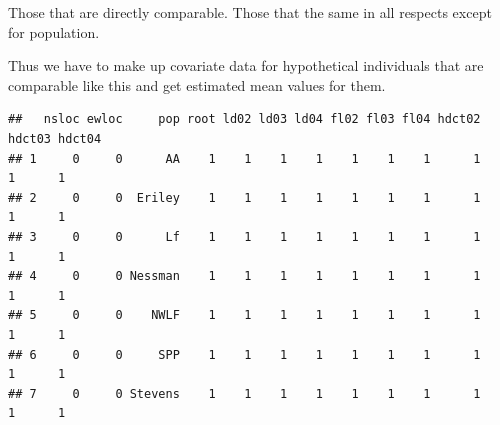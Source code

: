 \documentclass[
  ignorenonframetext,
]{beamer}
\newenvironment{Shaded}{\begin{snugshade}}{\end{snugshade}}
\newcommand{\AttributeTok}[1]{\textcolor[rgb]{0.13,0.29,0.53}{#1}}
\newcommand{\DecValTok}[1]{\textcolor[rgb]{0.00,0.00,0.81}{#1}}
\newcommand{\FunctionTok}[1]{\textcolor[rgb]{0.13,0.29,0.53}{\textbf{#1}}}
\newcommand{\NormalTok}[1]{#1}
\newcommand{\OtherTok}[1]{\textcolor[rgb]{0.56,0.35,0.01}{#1}}
\newcommand{\SpecialCharTok}[1]{\textcolor[rgb]{0.81,0.36,0.00}{\textbf{#1}}}
\begin{document}
\begin{frame}[fragile]{}
\protect\hypertarget{section-30}{}
Those that are directly comparable. Those that the same in all respects
except for population.

Thus we have to make up covariate data for hypothetical individuals that
are comparable like this and get estimated mean values for them.

\vspace{12pt}
\tiny

\begin{Shaded}
\end{Shaded}

\begin{verbatim}
##   nsloc ewloc     pop root ld02 ld03 ld04 fl02 fl03 fl04 hdct02 hdct03 hdct04
## 1     0     0      AA    1    1    1    1    1    1    1      1      1      1
## 2     0     0  Eriley    1    1    1    1    1    1    1      1      1      1
## 3     0     0      Lf    1    1    1    1    1    1    1      1      1      1
## 4     0     0 Nessman    1    1    1    1    1    1    1      1      1      1
## 5     0     0    NWLF    1    1    1    1    1    1    1      1      1      1
## 6     0     0     SPP    1    1    1    1    1    1    1      1      1      1
## 7     0     0 Stevens    1    1    1    1    1    1    1      1      1      1
\end{verbatim}
\end{frame}
\end{document}
